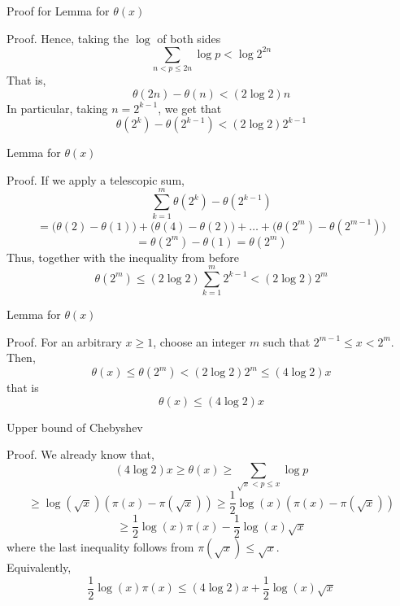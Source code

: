 \documentclass[18pt]{beamer}
\begin{document}
\begin{frame}{Proof for Lemma for $\theta(x)$}
    \begin{block}{Proof.}
        Hence, taking the $\log{}$ of both sides
        \[\sum\limits_{n < p \leq 2n} \log{p} < \log{2^{2n}}\]
        \pause{}
        That is,
        \[\theta(2n)-\theta(n) < (2\log{2})n\]
        \pause{}
        In particular, taking $n = 2^{k-1}$, we get that
        \[\theta(2^{k})-\theta(2^{k-1}) < (2\log{2})2^{k-1}\]
        \pause{}
    \end{block}
\end{frame}

\begin{frame}{Lemma          for $\theta(x)$}
    \begin{block}{Proof.}
        If we apply a telescopic sum,
        \[\sum\limits_{k=1} ^{m} \theta(2^{k}) - \theta(2^{k-1})\]
        \pause{}
        \[=\Big(\theta(2)-\theta(1)\Big) + \Big(\theta(4) - \theta(2)\Big) + \ldots + \Big(\theta(2^{m}) - \theta(2^{m-1})\Big)\]
        \pause{}
        \[= \theta(2^{m}) - \theta(1) = \theta(2^{m})\]
        \pause{}
        Thus, together with the inequality from before
        \[\theta(2^{m}) \leq (2\log{2}) \sum\limits_{k=1} ^{m} 2^{k-1} < (2\log{2})2^{m}\]
    \end{block}
\end{frame}

\begin{frame}{Lemma for $\theta(x)$}
    \begin{block}{Proof.}
       For an arbitrary $x \geq 1$, choose an integer $m$ such that $2^{m-1} \leq x < 2^{m}$.
       \pause{}
       Then,
       \[\theta(x) \leq \theta(2^{m}) < (2\log{2})2^{m} \leq (4\log{2})x\]
       \pause{}
       that is
       \[\theta(x) \leq (4\log{2})x\]
    \end{block}
\end{frame}

\begin{frame}{Upper bound of Chebyshev}
    \begin{block}{Proof.}
        We already know that,
            \[(4\log{2})x \geq \theta(x) \geq \sum\limits_{\sqrt{x} < p \leq x} \log{p}\]
        \pause{}
        \[\geq \log{(\sqrt{x})}(\pi(x) - \pi(\sqrt{x})) \geq \frac{1}{2}\log{(x)}(\pi(x)-\pi(\sqrt{x}))\]
        \pause{}
        \[\geq \frac{1}{2}\log{(x)}\pi(x)-\frac{1}{2}\log{(x)}\sqrt{x}\]
        where the last inequality follows from $\pi(\sqrt{x}) \leq \sqrt{x}$.\\
        Equivalently,
        \[\frac{1}{2}\log{(x)}\pi(x) \leq (4\log{2})x + \frac{1}{2}\log{(x)}\sqrt{x}\]
    \end{block}
\end{frame}
\end{document}
